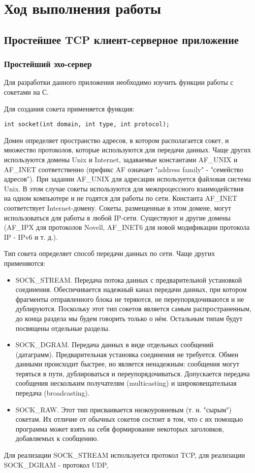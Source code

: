 \section{Ход выполнения работы}

\subsection{Простейшее TCP клиент-серверное приложение}

\subsubsection{Простейший эхо-сервер}

Для разработки данного приложения необходимо изучить функции работы с сокетами на С.

Для создания сокета применяется функция:
\begin{lstlisting}
int socket(int domain, int type, int protocol);
\end{lstlisting}

Домен определяет пространство адресов, в котором располагается сокет, и множество протоколов, которые используются для передачи данных. Чаще других используются домены Unix и Internet, задаваемые константами AF\_UNIX и AF\_INET соответственно (префикс AF означает "address family" - "семейство адресов"). При задании AF\_UNIX для адресации используется файловая система Unix. В этом случае сокеты используются для межпроцессного взаимодействия на одном компьютере и не годятся для работы по сети. Константа AF\_INET соответствует Internet-домену. Сокеты, размещенные в этом домене, могут использоваться для работы в любой IP-сети. Существуют и другие домены (AF\_IPX для протоколов Novell, AF\_INET6 для новой модификации протокола IP - IPv6 и т. д.).

Тип сокета определяет способ передачи данных по сети. Чаще других применяются:
\begin{itemize}
\item SOCK\_STREAM. Передача потока данных с предварительной установкой соединения. Обеспечивается надежный канал передачи данных, при котором фрагменты отправленного блока не теряются, не переупорядочиваются и не дублируются. Поскольку этот тип сокетов является самым распространенным, до конца раздела мы будем говорить только о нём. Остальным типам будут посвящены отдельные разделы.
\item SOCK\_DGRAM. Передача данных в виде отдельных сообщений (датаграмм). Предварительная установка соединения не требуется. Обмен данными происходит быстрее, но является ненадежным: сообщения могут теряться в пути, дублироваться и переупорядочиваться. Допускается передача сообщения нескольким получателям (multicasting) и широковещательная передача (broadcasting).
\item SOCK\_RAW. Этот тип присваивается низкоуровневым (т. н. "сырым") сокетам. Их отличие от обычных сокетов состоит в том, что с их помощью программа может взять на себя формирование некоторых заголовков, добавляемых к сообщению.
\end{itemize}
Для реализации SOCK\_STREAM используется протокол TCP, для реализации SOCK\_DGRAM - протокол UDP,

